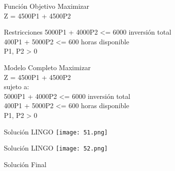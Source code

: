\documentclass{beamer}
\begin{document}
\begin{frame}[fragile]{Función Objetivo}
Maximizar\\
Z = 4500P1 + 4500P2

\end{frame}

\begin{frame}[fragile]{Restricciones}
5000P1 + 4000P2 <= 6000 inversión total\\
400P1 + 5000P2 <= 600 horas disponible\\
P1, P2 > 0\\

\end{frame}

\begin{frame}[fragile]{Modelo Completo}
Maximizar\\
Z = 4500P1 + 4500P2\\

sujeto a:\\
5000P1 + 4000P2 <= 6000 inversión total\\
400P1 + 5000P2 <= 600 horas disponible\\
P1, P2 > 0\\

\end{frame}

\begin{frame}[fragile]{Solución LINGO}
    \texttt{[image: 51.png]}
\end{frame}
\begin{frame}[fragile]{Solución LINGO}
    \texttt{[image: 52.png]}
\end{frame}

\begin{frame}[fragile]{Solución Final}
\end{frame}
\end{document}
